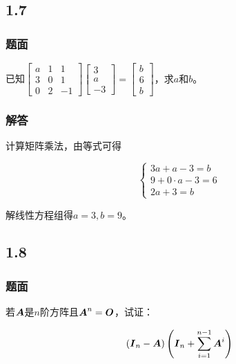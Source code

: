 \documentclass{beamer}
\begin{document}
\subsection*{1.7}

\begin{frame}
\frametitle{题面}

已知\(\begin{bmatrix}a&1&1\\3&0&1\\0&2&-1\end{bmatrix}\begin{bmatrix}3\\a\\-3\end{bmatrix}=\begin{bmatrix}b\\6\\b\end{bmatrix}\)，求\(a\)和\(b\)。

\end{frame}

\begin{frame}
\frametitle{解答}

    计算矩阵乘法，由等式可得

    \begin{equation*}
        \begin{cases}
            3a+a-3=b       \\
            9+0\cdot a-3=6 \\
            2a+3=b
        \end{cases}
    \end{equation*}

    解线性方程组得\(a=3,b=9\)。

\end{frame}

\subsection*{1.8}

\begin{frame}
\frametitle{题面}

若\(\boldsymbol{A}\)是\(n\)阶方阵且\(\boldsymbol{A}^n=\boldsymbol{O}\)，试证：

\begin{equation*}
    \left( \boldsymbol{I}_n-\boldsymbol{A} \right)\left( \boldsymbol{I}_n+\sum_{i=1}^{n-1}\boldsymbol{A}^i \right)
\end{equation*}

\end{frame}
\end{document}

